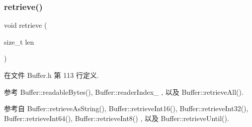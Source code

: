 \subsubsection{\texorpdfstring{retrieve()}{retrieve()}}
{\footnotesize\ttfamily void retrieve (\begin{DoxyParamCaption}\item[{size\+\_\+t}]{len }\end{DoxyParamCaption})\hspace{0.3cm}{\ttfamily [inline]}}



在文件 Buffer.\+h 第 113 行定义.



参考 Buffer\+::readable\+Bytes(), Buffer\+::reader\+Index\+\_\+ , 以及 Buffer\+::retrieve\+All().



参考自 Buffer\+::retrieve\+As\+String(), Buffer\+::retrieve\+Int16(), Buffer\+::retrieve\+Int32(), Buffer\+::retrieve\+Int64(), Buffer\+::retrieve\+Int8() , 以及 Buffer\+::retrieve\+Until().

